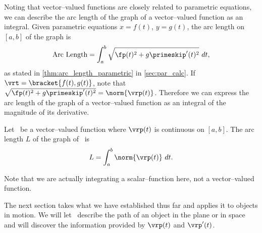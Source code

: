 Noting that vector--valued functions are closely related to parametric equations, we can describe the arc length of the graph of a vector--valued function as an integral. Given parametric equations $x=f(t)$, $y=g(t)$, the arc length on $[a,b]$ of the graph is
\[\text{Arc Length} = \int_a^b\sqrt{\fp(t)^2+g\primeskip'(t)^2}\ dt,\]
as stated in \autoref{thm:arc_length_parametric} in \autoref{sec:par_calc}. If $\vrt =\bracket{f(t), g(t)}$, note that $\sqrt{\fp(t)^2+g\primeskip'(t)^2} = \norm{\vrp(t)}$. Therefore we can express the arc length of the graph of a vector--valued function as an integral of the magnitude of its derivative.

{Let \vrt\ be a vector--valued function where $\vrp(t)$ is continuous on $[a,b]$. The arc length $L$ of the graph of \vrt\ is 
\[L = \int_a^b \norm{\vrp(t)}\ dt.\]}

Note that we are actually integrating a scalar--function here, not a vector--valued function.

The next section takes what we have established thus far and applies it to objects in motion. We will let \vrt\ describe the path of an object in the plane or in space and will discover the information provided by $\vrp(t)$ and $\vrp'(t)$.

